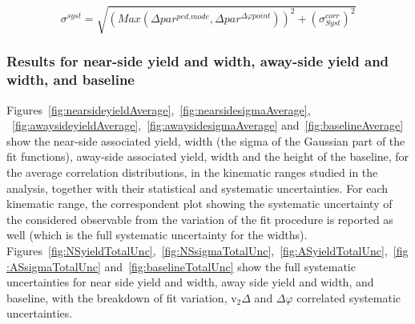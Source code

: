 \begin{equation}
\sigma^{syst} = \sqrt{\left(Max\left(\Delta par^{ped.mode},\Delta par^{\Delta\varphi point}\right)\right)^{2} + (\sigma_{Syst}^{corr})^{2}}
\end{equation}

\subsubsection{Results for near-side yield and width, away-side yield and width, and baseline}

Figures~\ref{fig:nearsideyieldAverage},~\ref{fig:nearsidesigmaAverage}, ~\ref{fig:awaysideyieldAverage},~\ref{fig:awaysidesigmaAverage} and~\ref{fig:baselineAverage} show the near-side associated yield, width (the sigma of the Gaussian part of the fit functions), away-side associated yield, width and the height of the baseline, for the average correlation distributions, in the kinematic ranges studied in the analysis, together with their statistical and systematic uncertainties. For each kinematic range, the correspondent plot showing the systematic uncertainty of the considered observable from the variation of the fit procedure is reported as well (which is the full systematic uncertainty for the widths).
Figures~\ref{fig:NSyieldTotalUnc},~\ref{fig:NSsigmaTotalUnc},~\ref{fig:ASyieldTotalUnc},~\ref{fig:ASsigmaTotalUnc} and~\ref{fig:baselineTotalUnc} show the full systematic uncertainties for near side yield and width, away side yield and width, and baseline, with the breakdown of fit variation, v$_2\Delta$ and $\Delta\varphi$ correlated systematic uncertainties.

